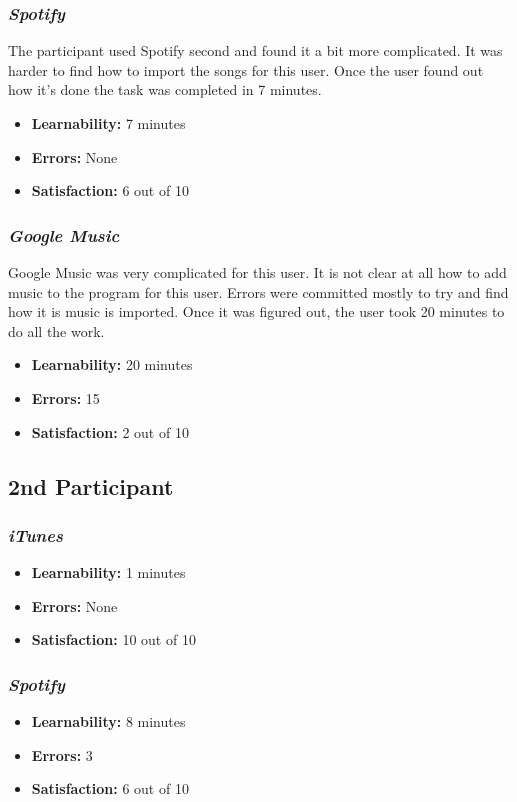 \documentclass{article}
\begin{document}
{\begin{multicols}{2}
\subsubsection{\it Spotify}
The participant used Spotify second and found it a bit more complicated. It was harder to find how to import the songs for this user. Once the user found out how it’s done the task was completed in 7 minutes.
\begin{itemize}
	\item {\bf Learnability:} 7 minutes
	\item {\bf Errors:} None
	\item {\bf Satisfaction:} 6 out of 10 
\end{itemize}

\subsubsection{\it Google Music}
Google Music was very complicated for this user. It is not clear at all how to add music to the program for this user. Errors were committed mostly to try and find how it is music is imported. Once it was figured out, the user took 20 minutes to do all the work.
\begin{itemize}
\item {\bf Learnability:} 20 minutes
	\item {\bf Errors:} 15
	\item {\bf Satisfaction:} 2 out of 10 
\end{itemize} 

\subsection{2nd Participant}

\subsubsection{\it iTunes}
\begin{itemize}
	\item {\bf Learnability:} 1 minutes
	\item {\bf Errors:}  None
	\item {\bf Satisfaction:} 10 out of 10 
\end{itemize}

\subsubsection{\it Spotify}
\begin{itemize}
	\item {\bf Learnability:} 8 minutes
	\item {\bf Errors:} 3
	\item {\bf Satisfaction:} 6 out of 10 
\end{itemize}


\end{multicols}}
\end{document}
